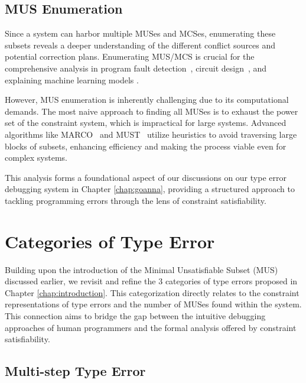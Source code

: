 \subsection*{MUS Enumeration}

Since a system can harbor multiple MUSes and MCSes, enumerating these subsets reveals a deeper understanding of the different conflict sources and potential correction plans. Enumerating MUS/MCS is crucial for the comprehensive analysis in program fault detection~\cite{Bekkouche2015-is}, circuit design~\cite{Gaber2022-te}, and explaining machine learning models \cite{Marques-Silva2023-nk}.

However, MUS enumeration is inherently challenging due to its computational demands. The most naive approach to finding all MUSes is to exhaust the power set of the constraint system, which is impractical for large systems. Advanced algorithms like MARCO~\cite{Liffiton2016-xi} and MUST~\cite{Bendik2020-pz} utilize heuristics to avoid traversing large blocks of subsets, enhancing efficiency and making the process viable even for complex systems.

This analysis forms a foundational aspect of our discussions on our type error debugging system in Chapter \ref{chap:goanna}, providing a structured approach to tackling programming errors through the lens of constraint satisfiability.

\section{Categories of Type Error}

Building upon the introduction of the Minimal Unsatisfiable Subset (MUS) discussed earlier, we revisit and refine the 3 categories of type errors proposed in Chapter \ref{chap:introduction}. This categorization directly relates to the constraint representations of type errors and the number of MUSes found within the system. This connection aims to bridge the gap between the intuitive debugging approaches of human programmers and the formal analysis offered by constraint satisfiability.

\subsection*{Multi-step Type Error}

